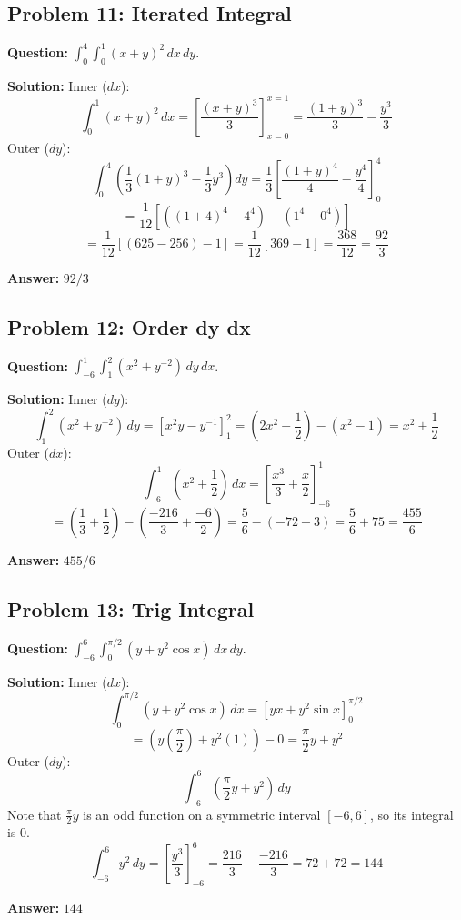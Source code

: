 \documentclass[11pt,a4paper]{article}
\begin{document}
\subsection*{Problem 11: Iterated Integral}
\textbf{Question:} $\int_0^4 \int_0^1 (x+y)^2 \, dx \, dy$.

\textbf{Solution:}
Inner ($dx$):
\[ \int_0^1 (x+y)^2 \, dx = \left[ \frac{(x+y)^3}{3} \right]_{x=0}^{x=1} = \frac{(1+y)^3}{3} - \frac{y^3}{3} \]
Outer ($dy$):
\[ \int_0^4 \left( \frac{1}{3}(1+y)^3 - \frac{1}{3}y^3 \right) dy = \frac{1}{3} \left[ \frac{(1+y)^4}{4} - \frac{y^4}{4} \right]_0^4 \]
\[ = \frac{1}{12} \left[ ((1+4)^4 - 4^4) - (1^4 - 0^4) \right] \]
\[ = \frac{1}{12} [ (625 - 256) - 1 ] = \frac{1}{12} [ 369 - 1 ] = \frac{368}{12} = \frac{92}{3} \]

\textbf{Answer:} $92/3$

\subsection*{Problem 12: Order dy dx}
\textbf{Question:} $\int_{-6}^1 \int_1^2 (x^2 + y^{-2}) \, dy \, dx$.

\textbf{Solution:}
Inner ($dy$):
\[ \int_1^2 (x^2 + y^{-2}) \, dy = \left[ x^2y - y^{-1} \right]_1^2 = (2x^2 - \frac{1}{2}) - (x^2 - 1) = x^2 + \frac{1}{2} \]
Outer ($dx$):
\[ \int_{-6}^1 (x^2 + \frac{1}{2}) \, dx = \left[ \frac{x^3}{3} + \frac{x}{2} \right]_{-6}^1 \]
\[ = (\frac{1}{3} + \frac{1}{2}) - (\frac{-216}{3} + \frac{-6}{2}) = \frac{5}{6} - (-72 - 3) = \frac{5}{6} + 75 = \frac{455}{6} \]

\textbf{Answer:} $455/6$

\subsection*{Problem 13: Trig Integral}
\textbf{Question:} $\int_{-6}^6 \int_0^{\pi/2} (y + y^2 \cos x) \, dx \, dy$.

\textbf{Solution:}
Inner ($dx$):
\[ \int_0^{\pi/2} (y + y^2 \cos x) \, dx = [yx + y^2 \sin x]_0^{\pi/2} \]
\[ = (y(\frac{\pi}{2}) + y^2(1)) - 0 = \frac{\pi}{2}y + y^2 \]
Outer ($dy$):
\[ \int_{-6}^6 (\frac{\pi}{2}y + y^2) \, dy \]
Note that $\frac{\pi}{2}y$ is an odd function on a symmetric interval $[-6,6]$, so its integral is 0.
\[ \int_{-6}^6 y^2 \, dy = \left[ \frac{y^3}{3} \right]_{-6}^6 = \frac{216}{3} - \frac{-216}{3} = 72 + 72 = 144 \]

\textbf{Answer:} $144$

\end{document}
